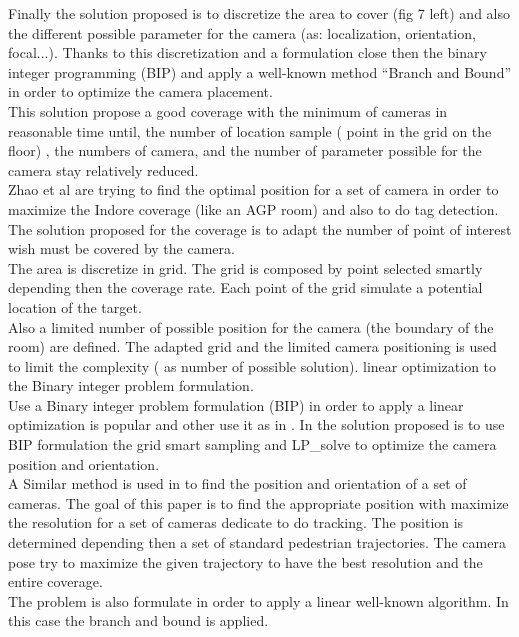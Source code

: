 Finally the solution proposed is to discretize the area to cover (fig 7 left) and also the different possible parameter for the camera (as: localization, orientation, focal...). Thanks to this discretization and a formulation close then the binary integer programming (BIP) and apply a well-known method “Branch and Bound” in order to optimize the camera placement.  \\
This solution  propose a  good  coverage with the minimum of cameras  in reasonable time until, the  number of location sample ( point in the grid on the floor) , the numbers of camera, and the number of parameter possible for the camera stay relatively  reduced.  \\
 
Zhao  et al \cite{22*zhao2008} are trying to find the optimal position for a set of camera in order to maximize the  Indore coverage (like an AGP room) and also to  do tag detection.
The solution proposed for the coverage is to adapt the number of point of interest wish must be covered by the camera. \\
The area is discretize in grid.  The grid is composed by point selected smartly depending then the coverage rate. Each point of the grid simulate a potential location of the target.\\
Also a limited number of possible position for the camera (the boundary of the room) are defined.
The adapted grid and the limited camera positioning is used to limit the complexity ( as number of possible solution).  linear optimization to the Binary integer problem formulation. \\
Use a Binary integer problem formulation (BIP) in order to apply a linear optimization is popular and other use it as in \cite{22*zhao2008,27*bodor2005,43*erdem2006}. In \cite{22*zhao2008} the solution proposed is to use BIP formulation the grid smart sampling and LP\_solve to optimize the camera position and orientation.\\

 A Similar method is used in \cite{27*bodor2005} to find the position and orientation of a set of cameras. The goal of this paper is to find the appropriate position with maximize the resolution for a set of cameras dedicate to do tracking. The position is determined depending then a set of standard pedestrian trajectories. The camera pose try to maximize the given trajectory to have the best resolution and the entire coverage. \\
The problem is also formulate in order to apply a linear well-known algorithm. In this case the branch and bound is applied.  

